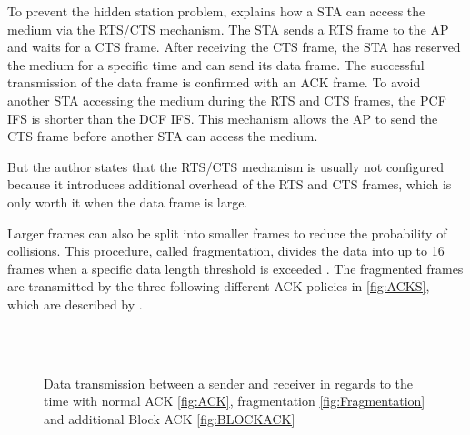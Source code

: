 To prevent the hidden station problem, \textcite[282-283]{sauter_wireless_2022} explains how a \ac{STA} can access the medium
via the \ac{RTS}/\ac{CTS} mechanism.
The \ac{STA} sends a \ac{RTS} frame to the \ac{AP} and waits for a \ac{CTS} frame.
After receiving the \ac{CTS} frame, the \ac{STA} has reserved the medium for a specific time and can send its data frame.
The successful transmission of the data frame is confirmed with an \ac{ACK} frame.
To avoid another \ac{STA} accessing the medium during the \ac{RTS} and \ac{CTS} frames, the \ac{PCF} \ac{IFS} is
shorter than the \ac{DCF} \ac{IFS}.
This mechanism allows the \ac{AP} to send the \ac{CTS} frame before another \ac{STA} can access the medium.

But the author states that the \ac{RTS}/\ac{CTS} mechanism is usually not configured because it introduces additional
overhead of the \ac{RTS} and \ac{CTS} frames, which is only worth it when the data frame is large.

Larger frames can also be split into smaller frames to reduce the probability of collisions.
This procedure, called fragmentation, divides the data into up to \num{16} frames
when a specific data length threshold is exceeded \cite{ieee_standard_2009n}.
The fragmented frames are transmitted by the three following different \ac{ACK} policies in \autoref{fig:ACKS}, which are described by \textcite[334-335]{sauter_wireless_2022}.

\begin{figure}%
    \centering
    \\
    \\
    \caption{Data transmission between a sender and receiver in regards to the time with normal \acf{ACK} \autoref{fig:ACK},
    fragmentation \autoref{fig:Fragmentation} and additional Block \ac{ACK} \autoref{fig:BLOCKACK}}%
    \label{fig:ACKS}%
\end{figure}

